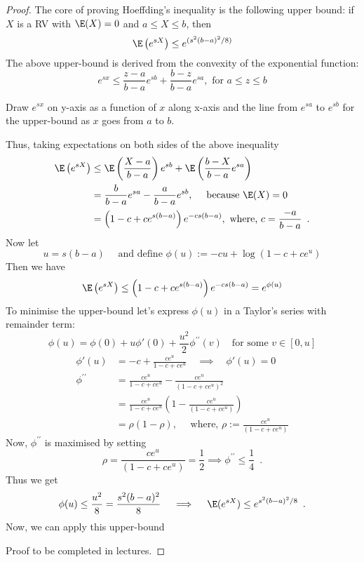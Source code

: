 \begin{proof}
The core of proving Hoeffding's inequality is the following upper bound: if $X$ is a RV with $\E(X)=0$ and $a \leq X \leq b$, then
\[
\E \left( e^{sX}\right) \leq e^{(s^2(b-a)^2/8)}
\] 
The above upper-bound is derived from the convexity of the exponential function:
\[
e^{sx} \leq \frac{z-a}{b-a}e^{sb} + \frac{b-z}{b-a}e^{sa}, \text{ for } a \leq z \leq b
\]

{\scriptsize Draw $e^{sx}$ on y-axis as a function of $x$ along x-axis and the line from $e^{sa}$ to $e^{sb}$ for the upper-bound as $x$ goes from $a$ to $b$.}

\vspace{4cm}

Thus, taking expectations on both sides of the above inequality
\begin{align*}
\E \left( e^{sX}\right) 
&\leq
\E\left( \frac{X-a}{b-a}\right) e^{sb} +   \E \left( \frac{b-X}{b-a} e^{sa} \right)\\
&= \frac{b}{b-a} e^{sa} - \frac{a}{b-a} e^{sb}, \quad \text{ because } \E(X)=0\\
&= \left( 1 - c + c e^{s(b-a)} \right) e^{-c s(b-a)}, \text{ where, } c=\frac{-a}{b-a}\enspace.
\end{align*}
Now let
\[
u=s(b-a) \quad \text{ and define } \phi(u) := -c u + \log(1-c+ce^u)
\]
Then we have
\[
\E \left( e^{sX} \right) \leq \left( 1-c+ce^{s(b-a)}\right) e^{- c s (b-a)} = e^{\phi(u)}
\]
To minimise the upper-bound let's express $\phi(u)$ in a Taylor's series with remainder term:
\[
\phi(u) = \phi(0) + u \phi'(0) + \frac{u^2}{2} \phi^{\prime\prime}(v) \quad \text{for some } v \in [0,u]
\]
\begin{align*}
\phi'(u)
&= -c + \frac{c e^u}{1-c+ce^u} \quad \implies \quad \phi'(u)=0 \\
\phi^{\prime \prime}
&= \frac{c e^u}{1-c+ce^u} - \frac{ce^u}{(1-c+ce^u)^2}\\
&= \frac{c e^u}{1-c+ce^u} \left(1 - \frac{ce^u}{(1-c+ce^u)} \right)\\
&= \rho(1-\rho), \quad \text{ where, } \rho := \frac{ce^u}{(1-c+ce^u)}  
\end{align*}
Now, $\phi^{\prime\prime}$ is maximised by setting
\[
\rho = \frac{ce^u}{(1-c+ce^u)} = \frac{1}{2} \implies \phi^{\prime\prime} \leq \frac{1}{4} \enspace .
\]
Thus we get
\[
\phi(u) \leq \frac{u^2}{8} = \frac{s^2(b-a)^2}{8} \quad \implies \quad \E(e^{sX}) \leq e^{s^2(b-a)^2/8} \enspace .
\]
Now, we can apply this upper-bound

\vspace{5cm}

{\scriptsize Proof to be completed in lectures}.

\end{proof}

